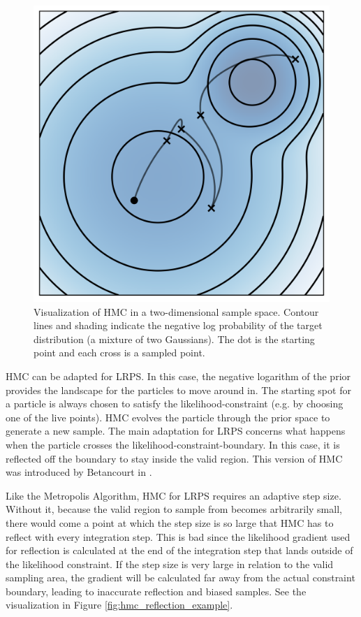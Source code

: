 \documentclass[12pt, a4paper]{report}
\begin{document}
\begin{figure}
    \centering
    \includegraphics[scale=0.8]{figs/hmc_example.png}
    \caption{Visualization of HMC in a two-dimensional sample space. Contour lines and shading indicate the negative log probability of the target distribution (a mixture of two Gaussians). The dot is the starting point and each cross is a sampled point.}
    \label{fig:hmc_example}
\end{figure}

HMC can be adapted for LRPS.
In this case, the negative logarithm of the prior provides the landscape for the particles to move around in.
The starting spot for a particle is always chosen to satisfy the likelihood-constraint (e.g. by choosing one of the live points).
HMC evolves the particle through the prior space to generate a new sample.
The main adaptation for LRPS concerns what happens when the particle crosses the likelihood-constraint-boundary.
In this case, it is reflected off the boundary to stay inside the valid region.
This version of HMC was introduced by Betancourt in \cite{hmc_in_ns}.

Like the Metropolis Algorithm, HMC for LRPS requires an adaptive step size.
Without it, because the valid region to sample from becomes arbitrarily small, there would come a point at which the step size is so large that HMC has to reflect with every integration step.
This is bad since the likelihood gradient used for reflection is calculated at the end of the integration step that lands outside of the likelihood constraint.
If the step size is very large in relation to the valid sampling area, the gradient will be calculated far away from the actual constraint boundary, leading to inaccurate reflection and biased samples.
See the visualization in Figure \ref{fig:hmc_reflection_example}.
\end{document}
